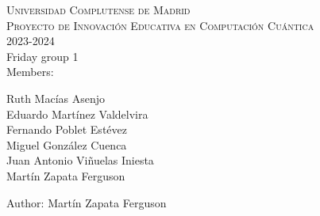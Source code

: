 \documentclass[11pt]{article}
\begin{document}
\begin{center}
            \textsc{Universidad Complutense de Madrid}\\
            \huge\textsc{Proyecto de Innovación Educativa en
Computación Cuántica}\\ \vspace{.1cm}
            \large 2023-2024\\ \vspace{.2cm}
            \LARGE Friday group 1 \\ \vspace{.2cm}
            \normalsize Members:\\ \vspace{.2cm}
            \begin{multicols}{3}
             Ruth Macías Asenjo \\  Eduardo Martínez Valdelvira\\
             Fernando Poblet Estévez \\ Miguel González Cuenca\\
              Juan Antonio Viñuelas Iniesta \\ Martín Zapata Ferguson
            \end{multicols} \vspace{.2cm}
            Author: Martín Zapata Ferguson

\end{center}
\end{document}
